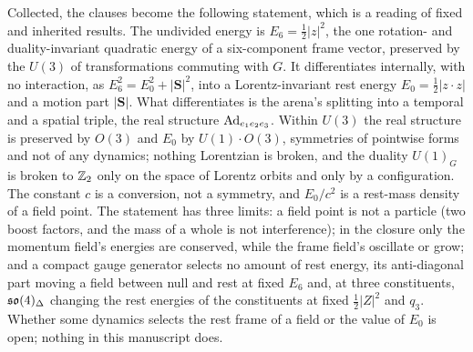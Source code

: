Collected, the clauses become the following statement, which is a reading of fixed and inherited results. The undivided energy is
$E_6=\tfrac12|z|^2$, the one rotation- and duality-invariant quadratic energy of a six-component frame vector, preserved by the $U(3)$ of
transformations commuting with $G$. It
differentiates internally, with no interaction, as $E_6^2=E_0^2+|\mathbf S|^2$, into a Lorentz-invariant rest energy $E_0=\tfrac12|z\cdot z|$ and a
motion part $|\mathbf S|$. What differentiates is the arena's splitting into a temporal and a spatial triple, the real structure $\operatorname{Ad}_{e_1e_2e_3}$.
Within $U(3)$ the real structure is preserved by $O(3)$ and $E_0$ by $U(1)\cdot O(3)$, symmetries of pointwise forms and not of any dynamics; nothing Lorentzian is broken, and the duality
$U(1)_G$ is broken to $\mathbb{Z}_2$ only on the space of Lorentz orbits and only by a configuration. The constant $c$ is a conversion, not a symmetry, and
$E_0/c^2$ is a rest-mass density of a field point. The statement has three limits: a field point is not a particle (two boost factors, and the mass of
a whole is not interference); in the closure only the momentum field's energies are conserved, while the frame field's oscillate or grow; and a compact
gauge generator selects no amount of rest energy, its anti-diagonal part moving a field between null and rest at fixed $E_6$ and, at three
constituents, $\mathfrak{so}(4)_\Delta$ changing the rest energies of the constituents at fixed $\tfrac12|Z|^2$ and $q_3$. Whether some dynamics selects the rest
frame of a field or the value of $E_0$ is open; nothing in this manuscript does.

